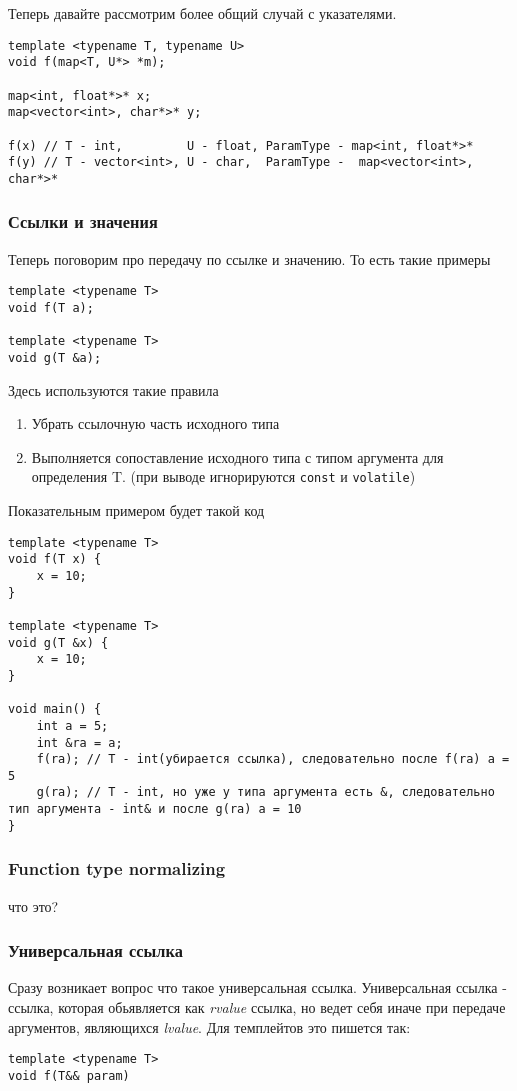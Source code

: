 			Теперь давайте рассмотрим более общий случай с указателями.
\begin{verbatim}
template <typename T, typename U>
void f(map<T, U*> *m);

map<int, float*>* x;
map<vector<int>, char*>* y;

f(x) // T - int,         U - float, ParamType - map<int, float*>*
f(y) // T - vector<int>, U - char,  ParamType -  map<vector<int>, char*>*
\end{verbatim}
		\subsubsection{Ссылки и значения}
			Теперь поговорим про передачу по ссылке и значению. То есть такие примеры
\begin{verbatim}
template <typename T>
void f(T a);

template <typename T>
void g(T &a);
\end{verbatim}
			
			Здесь используются такие правила
			\begin{enumerate}
				\item Убрать ссылочную часть исходного типа
				\item Выполняется сопоставление исходного типа с типом аргумента для определения T. (при выводе игнорируются \texttt{const} и \texttt{volatile})
			\end{enumerate}
			Показательным примером будет такой код
\begin{verbatim}
template <typename T>
void f(T x) {
	x = 10;
}

template <typename T>
void g(T &x) {
	x = 10;
}

void main() {
	int a = 5;
	int &ra = a;
	f(ra); // T - int(убирается ссылка), следовательно после f(ra) a = 5
	g(ra); // T - int, но уже у типа аргумента есть &, следовательно тип аргумента - int& и после g(ra) a = 10
}
\end{verbatim}
		
		\subsubsection{Function type normalizing} что это?
		
		\subsubsection{Универсальная ссылка}
			Сразу возникает вопрос что такое универсальная ссылка. Универсальная ссылка - ссылка, которая обьявляется как \textit{rvalue} ссылка, но ведет себя иначе при передаче аргументов, являющихся \textit{lvalue}.
			Для темплейтов это пишется так:
\begin{verbatim}
template <typename T>
void f(T&& param)
\end{verbatim}
			
